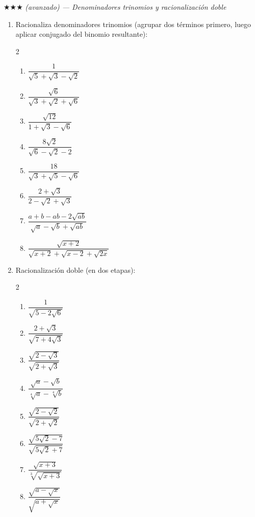 \documentclass[11pt, letterpaper]{article}
\begin{document}
$\bigstar\bigstar\bigstar$ \textit{(avanzado) — Denominadores trinomios y racionalización doble}

\begin{enumerate}[label=\textbf{\arabic*.}, leftmargin=*, resume]
  \item Racionaliza denominadores trinomios (agrupar dos términos primero, luego aplicar conjugado del binomio resultante):
  \begin{multicols}{2}
  \begin{enumerate}[label=\alph*)]
    \item $\dfrac{1}{\sqrt{5}+\sqrt{3}-\sqrt{2}}$
    \item $\dfrac{\sqrt{6}}{\sqrt{3}+\sqrt{2}+\sqrt{6}}$
    \item $\dfrac{\sqrt{12}}{1+\sqrt{3}-\sqrt{6}}$
    \item $\dfrac{8\sqrt{2}}{\sqrt{6}-\sqrt{2}-2}$
    \item $\dfrac{18}{\sqrt{3}+\sqrt{5}-\sqrt{6}}$
    \item $\dfrac{2+\sqrt{3}}{2-\sqrt{2}+\sqrt{3}}$
    \item $\dfrac{a+b-ab-2\sqrt{ab}}{\sqrt{a}-\sqrt{b}+\sqrt{ab}}$
    \item $\dfrac{\sqrt{x+2}}{\sqrt{x+2}+\sqrt{x-2}+\sqrt{2x}}$
  \end{enumerate}
  \end{multicols}

  \item Racionalización doble (en dos etapas):
  \begin{multicols}{2}
  \begin{enumerate}[label=\alph*)]
    \item $\dfrac{1}{\sqrt{5-2\sqrt{6}}}$
    \item $\dfrac{2+\sqrt{3}}{\sqrt{7+4\sqrt{3}}}$
    \item $\dfrac{\sqrt{2-\sqrt{3}}}{\sqrt{2+\sqrt{3}}}$
    \item $\dfrac{\sqrt{a}-\sqrt{b}}{\sqrt[4]{a}-\sqrt[4]{b}}$
    \item $\dfrac{\sqrt{2-\sqrt{2}}}{\sqrt{2+\sqrt{2}}}$
    \item $\dfrac{\sqrt{5\sqrt{2}-7}}{\sqrt{5\sqrt{2}+7}}$
    \item $\dfrac{\sqrt{x+3}}{\sqrt[3]{\sqrt{x+3}}}$
    \item $\dfrac{\sqrt{a-\sqrt{x}}}{\sqrt{a+\sqrt{x}}}$
  \end{enumerate}
  \end{multicols}
\end{enumerate}
\end{document}
